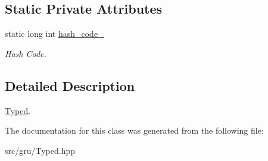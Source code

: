 \subsection*{\-Static \-Private \-Attributes}
\begin{DoxyCompactItemize}
\item 
\hypertarget{classNeb_1_1Typed_a408b18ff45c3d6c00477b2a680ac1226}{static long int \hyperlink{classNeb_1_1Typed_a408b18ff45c3d6c00477b2a680ac1226}{hash\-\_\-code\-\_\-}}\label{classNeb_1_1Typed_a408b18ff45c3d6c00477b2a680ac1226}

\begin{DoxyCompactList}\small\item\em \-Hash \-Code. \end{DoxyCompactList}\end{DoxyCompactItemize}


\subsection{\-Detailed \-Description}
\hyperlink{classNeb_1_1Typed}{\-Typed}. 

\-The documentation for this class was generated from the following file\-:\begin{DoxyCompactItemize}
\item 
src/gru/\-Typed.\-hpp\end{DoxyCompactItemize}
